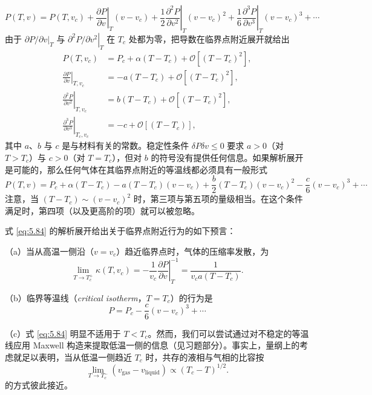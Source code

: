 \begin{equation}\label{eq:5.82}
P(T,v)=P(T,v_c)+\left.\frac{\partial P}{\partial v}\right|_T(v-v_c)+\frac{1}{2}\left.\frac{\partial^2P}{\partial v^2}\right|_T(v-v_c)^2+\frac{1}{6}\left.\frac{\partial^3P}{\partial v^3}\right|_T(v-v_c)^3+\cdots
\end{equation}
由于 $\left.\partial P/\partial v\right|_T$ 与 $\left.\partial^2P/\partial v^2\right|_T$ 在 $T_c$ 处都为零，把导数在临界点附近展开就给出
\begin{equation}\label{eq:5.83}
\begin{aligned}
P(T,v_c)&=P_c+\alpha(T-T_c)+\mathcal{O}\left[(T-T_c)^2\right],\\
\left.\frac{\partial P}{\partial v}\right|_{T,v_c}&=-a(T-T_c)+\mathcal{O}\left[(T-T_c)^2\right],\\
\left.\frac{\partial^2P}{\partial v^2}\right|_{T,v_c}&=b(T-T_c)+\mathcal{O}\left[(T-T_c)^2\right],\\
\left.\frac{\partial^3P}{\partial v^3}\right|_{T_c,v_c}&=-c+\mathcal{O}\left[(T-T_c)\right],
\end{aligned}
\end{equation}
其中 $a$、$b$ 与 $c$ 是与材料有关的常数。稳定性条件 $\delta P\delta v\le0$ 要求 $a>0$（对 $T>T_c$）与 $c>0$（对 $T=T_c$），但对 $b$ 的符号没有提供任何信息。如果解析展开是可能的，那么任何气体在其临界点附近的等温线都必须具有一般形式
\begin{equation}\label{eq:5.84}
P(T,v)=P_c+\alpha(T-T_c)-a(T-T_c)(v-v_c)+\frac{b}{2}(T-T_c)(v-v_c)^2-\frac{c}{6}(v-v_c)^3+\cdots
\end{equation}
注意，当 $(T-T_c)\sim(v-v_c)^2$ 时，第三项与第五项的量级相当。在这个条件满足时，第四项（以及更高阶的项）就可以被忽略。

式 \eqref{eq:5.84} 的解析展开给出关于临界点附近行为的如下预言：

（a）当从高温一侧沿（$v=v_c$）趋近临界点时，气体的压缩率发散，为
\begin{equation}\label{eq:5.85}
\lim_{T\to T_c^+}\kappa(T,v_c)=-\frac{1}{v_c}\left.\frac{\partial P}{\partial v}\right|_T^{-1}=\frac{1}{v_ca(T-T_c)}.
\end{equation}

（b）临界等温线（\textit{critical isotherm}，$T=T_c$）的行为是
\begin{equation}\label{eq:5.86}
P=P_c-\frac{c}{6}(v-v_c)^3+\cdots
\end{equation}

（c）式 \eqref{eq:5.84} 明显不适用于 $T<T_c$。然而，我们可以尝试通过对不稳定的等温线应用 Maxwell 构造来提取低温一侧的信息（见习题部分）。事实上，量纲上的考虑就足以表明，当从低温一侧趋近 $T_c$ 时，共存的液相与气相的比容按
\begin{equation}\label{eq:5.87}
\lim_{T\to T_c^-}(v_{\text{gas}}-v_{\text{liquid}})\propto(T_c-T)^{1/2}.
\end{equation}
的方式彼此接近。

